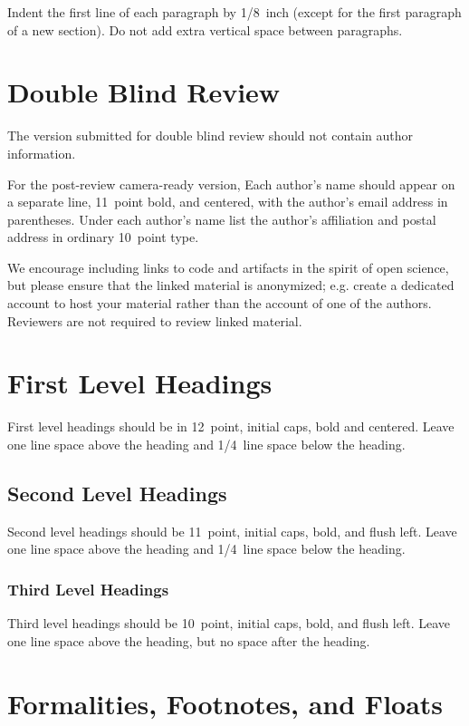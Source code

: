 \documentclass[10pt,letterpaper]{article}
\begin{document}
Indent the first line of each paragraph by 1/8~inch (except for the
first paragraph of a new section). Do not add extra vertical space
between paragraphs.

\section{Double Blind Review}

The version submitted for double blind review should not contain author information.

For the post-review camera-ready version, Each author's name should appear on a separate line, 11~point bold, and centered, with the author's email address in parentheses. Under each author's name list the
author's affiliation and postal address in ordinary 10~point type.

We encourage including links to code and artifacts in the spirit of open science, but please ensure that the linked material is anonymized; e.g. create a dedicated account to host your material rather than the account of one of the authors. Reviewers are not required to review linked material.




\section{First Level Headings}

First level headings should be in 12~point, initial caps, bold and
centered. Leave one line space above the heading and 1/4~line space
below the heading.


\subsection{Second Level Headings}

Second level headings should be 11~point, initial caps, bold, and
flush left. Leave one line space above the heading and 1/4~line
space below the heading.


\subsubsection{Third Level Headings}

Third level headings should be 10~point, initial caps, bold, and flush
left. Leave one line space above the heading, but no space after the
heading.


\section{Formalities, Footnotes, and Floats}
\end{document}
